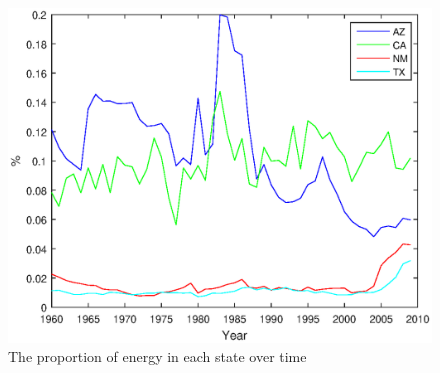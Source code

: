 \begin{figure}[htbp]
{\begin{minipage}{7cm}
			\includegraphics[scale=0.4]{figure/Thedistributionofrenewableenergyovertime}    %
	\end{minipage}}
	\caption{The  proportion of energy in each state over time}                      %
	\label{fig:fenbutu}                                       %
\end{figure}
